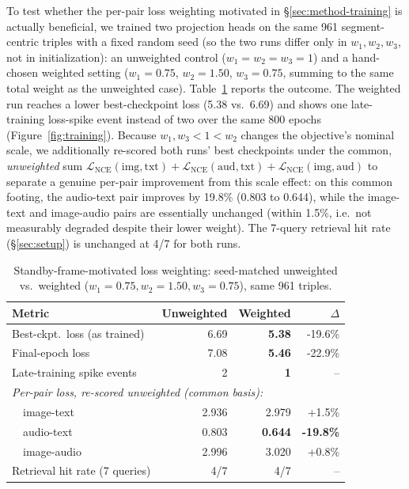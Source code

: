 ﻿\documentclass[twocolumn]{article}
\begin{document}
To test whether the per-pair loss weighting motivated in \S\ref{sec:method-training} is actually
beneficial, we trained two projection heads on the same 961 segment-centric triples with a fixed
random seed (so the two runs differ only in $w_1, w_2, w_3$, not in initialization): an unweighted
control ($w_1=w_2=w_3=1$) and a hand-chosen weighted setting ($w_1=0.75$, $w_2=1.50$, $w_3=0.75$,
summing to the same total weight as the unweighted case). Table~\ref{tab:weighting} reports the
outcome. The weighted run reaches a lower best-checkpoint loss (5.38 vs.\ 6.69) and shows one
late-training loss-spike event instead of two over the same 800 epochs (Figure~\ref{fig:training}).
Because $w_1, w_3 < 1 < w_2$ changes the objective's nominal scale, we additionally re-scored both
runs' best checkpoints under the common, \emph{unweighted} sum $\mathcal{L}_{\text{NCE}}(\text{img},
\text{txt}) + \mathcal{L}_{\text{NCE}}(\text{aud},\text{txt}) + \mathcal{L}_{\text{NCE}}(\text{img},
\text{aud})$ to separate a genuine per-pair improvement from this scale effect: on this common
footing, the audio-text pair improves by 19.8\% (0.803 to 0.644), while the image-text and
image-audio pairs are essentially unchanged (within 1.5\%, i.e.\ not measurably degraded despite
their lower weight). The 7-query retrieval hit rate (\S\ref{sec:setup}) is unchanged at 4/7 for both
runs.

\begin{table}[t]
\centering
\caption{Standby-frame-motivated loss weighting: seed-matched unweighted vs.\ weighted
($w_1=0.75, w_2=1.50, w_3=0.75$), same 961 triples.}
\label{tab:weighting}
\scriptsize
\begin{tabular}{lrrr}
\toprule
Metric & Unweighted & Weighted & $\Delta$ \\
\midrule
Best-ckpt.\ loss (as trained) & 6.69 & \textbf{5.38} & -19.6\% \\
Final-epoch loss & 7.08 & \textbf{5.46} & -22.9\% \\
Late-training spike events & 2 & \textbf{1} & -- \\
\midrule
\multicolumn{4}{l}{\textit{Per-pair loss, re-scored unweighted (common basis):}} \\
\ \ image-text & 2.936 & 2.979 & +1.5\% \\
\ \ audio-text & 0.803 & \textbf{0.644} & \textbf{-19.8\%} \\
\ \ image-audio & 2.996 & 3.020 & +0.8\% \\
\midrule
Retrieval hit rate (7 queries) & 4/7 & 4/7 & -- \\
\bottomrule
\end{tabular}
\end{table}
\end{document}
